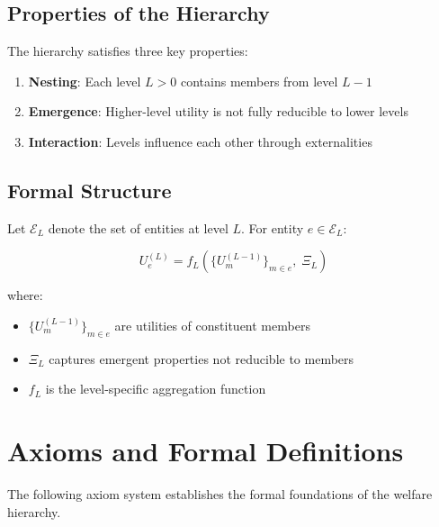 \subsection{Properties of the Hierarchy}

The hierarchy satisfies three key properties:

\begin{enumerate}
\item \textbf{Nesting}: Each level $L > 0$ contains members from level $L-1$
\item \textbf{Emergence}: Higher-level utility is not fully reducible to lower levels
\item \textbf{Interaction}: Levels influence each other through externalities
\end{enumerate}

\subsection{Formal Structure}

Let $\mathcal{E}_L$ denote the set of entities at level $L$. For entity $e \in \mathcal{E}_L$:

\begin{equation}
U_e^{(L)} = f_L\left( \{U_m^{(L-1)}\}_{m \in e}, \; \Xi_L \right)
\end{equation}

where:
\begin{itemize}
\item $\{U_m^{(L-1)}\}_{m \in e}$ are utilities of constituent members
\item $\Xi_L$ captures emergent properties not reducible to members
\item $f_L$ is the level-specific aggregation function
\end{itemize}


\section{Axioms and Formal Definitions}
\label{sec:who-axioms}

The following axiom system establishes the formal foundations of the welfare hierarchy.

